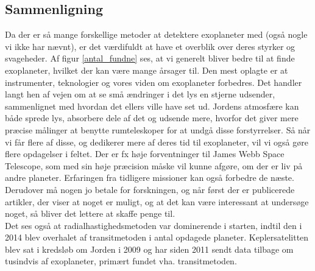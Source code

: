\subsection*{Sammenligning}
Da der er så mange forskellige metoder at detektere exoplaneter med (også nogle vi ikke har nævnt), er det værdifuldt at have et overblik over deres styrker og svageheder. Af figur \ref{antal_fundne} ses, at vi generelt bliver bedre til at finde exoplaneter, hvilket der kan være mange årsager til. Den mest oplagte er at instrumenter, teknologier og vores viden om exoplaneter forbedres. Det handler langt hen af vejen om at se små ændringer i det lys en stjerne udsender, sammenlignet med hvordan det ellers ville have set ud. Jordens atmosfære kan både sprede lys, absorbere dele af det og udsende mere, hvorfor det giver mere præcise målinger at benytte rumteleskoper for at undgå disse forstyrrelser. Så når vi får flere af disse, og dedikerer mere af deres tid til exoplaneter, vil vi også gøre flere opdagelser i feltet. Der er fx høje forventninger til James Webb Space Telescope, som med sin høje præcision måske vil kunne afgøre, om der er liv på andre planeter.  %
Erfaringen fra tidligere missioner kan også forbedre de næste. Derudover må nogen jo betale for forskningen, og når først der er publicerede artikler, der viser at noget er muligt, og at det kan være interessant at undersøge noget, så bliver det lettere at skaffe penge til. \\ %

Det ses også at radialhastighedsmetoden var dominerende i starten, indtil den i 2014 blev overhalet af transitmetoden i antal opdagede planeter. %
Keplersatelitten blev sat i kredsløb om Jorden i 2009 og har siden 2011 sendt data tilbage om tusindvis af exoplaneter, primært fundet vha. transitmetoden. %

